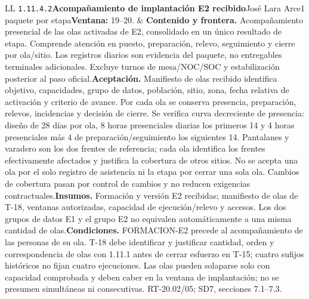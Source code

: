 \begin{longtable}{L{\tabcolsep\relax}L{\tabcolsep\relax}}
\texttt{1.\allowbreak{}11.\allowbreak{}4.\allowbreak{}2}\newline{}\textbf{Acompañamiento de implantación E2 recibido}\newline{}José Lara Arce\newline{}1 paquete por etapa\newline{}\textbf{Ventana:} 19--20. & \textbf{Contenido y frontera.} Acompañamiento presencial de las olas activadas de E2, consolidado en un único resultado de etapa. Comprende atención en puesto, preparación, relevo, seguimiento y cierre por ola/sitio. Los registros diarios son evidencia del paquete, no entregables terminales adicionales. Excluye turnos de mesa/NOC/SOC y estabilización posterior al paso oficial.\newline{}\textbf{Aceptación.} Manifiesto de olas recibido identifica objetivo, capacidades, grupo de datos, población, sitio, zona, fecha relativa de activación y criterio de avance. Por cada ola se conserva presencia, preparación, relevos, incidencias y decisión de cierre. Se verifica curva decreciente de presencia: diseño de 28 días por ola, 8 horas presenciales diarias los primeros 14 y 4 horas presenciales más 4 de preparación/seguimiento los siguientes 14. Pantalanes y varadero son los dos frentes de referencia; cada ola identifica los frentes efectivamente afectados y justifica la cobertura de otros sitios. No se acepta una ola por el solo registro de asistencia ni la etapa por cerrar una sola ola. Cambios de cobertura pasan por control de cambios y no reducen exigencias contractuales.\newline{}\textbf{Insumos.} Formación y versión E2 recibidas; manifiesto de olas de T-18, ventanas autorizadas, capacidad de ejecución/relevo y accesos. Los dos grupos de datos E1 y el grupo E2 no equivalen automáticamente a una misma cantidad de olas.\newline{}\textbf{Condiciones.} FORMACION-E2 precede al acompañamiento de las personas de su ola. T-18 debe identificar y justificar cantidad, orden y correspondencia de olas con 1.11.1 antes de cerrar esfuerzo en T-15; cuatro sufijos históricos no fijan cuatro ejecuciones. Las olas pueden solaparse solo con capacidad comprobada y deben caber en la ventana de implantación; no se presumen simultáneas ni consecutivas. RT-20.02/05; SD7, secciones 7.1--7.3.\\\hline

\end{longtable}
